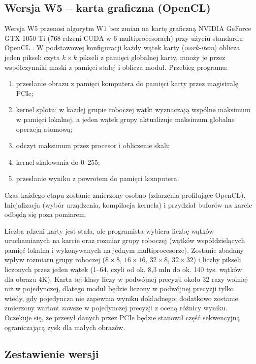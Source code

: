 \documentclass[12pt,a4paper]{article}
\begin{document}
\subsection{Wersja W5 -- karta graficzna (OpenCL)}

Wersja W5 przenosi algorytm W1 bez zmian na kartę graficzną NVIDIA GeForce GTX 1050 Ti (768 rdzeni CUDA w 6 multiprocesorach) przy użyciu standardu OpenCL \cite{opencl}. W podstawowej konfiguracji każdy wątek karty (\emph{work-item}) oblicza jeden piksel: czyta $k \times k$ pikseli z pamięci globalnej karty, mnoży je przez współczynniki maski z pamięci stałej i oblicza moduł. Przebieg programu:
\begin{enumerate}
	\item przesłanie obrazu z pamięci komputera do pamięci karty przez magistralę PCIe;
	\item kernel splotu; w każdej grupie roboczej wątki wyznaczają wspólne maksimum w pamięci lokalnej, a jeden wątek grupy aktualizuje maksimum globalne operacją atomową;
	\item odczyt maksimum przez procesor i obliczenie skali;
	\item kernel skalowania do 0--255;
	\item przesłanie wyniku z powrotem do pamięci komputera.
\end{enumerate}
Czas każdego etapu zostanie zmierzony osobno (zdarzenia profilujące OpenCL). Inicjalizacja (wybór urządzenia, kompilacja kernela) i przydział buforów na karcie odbędą się poza pomiarem.

Liczba rdzeni karty jest stała, ale programista wybiera liczbę wątków uruchamianych na karcie oraz rozmiar grupy roboczej (wątków współdzielących pamięć lokalną i wykonywanych na jednym multiprocesorze). Zostanie zbadany wpływ rozmiaru grupy roboczej ($8\times8$, $16\times16$, $32\times8$, $32\times32$) i liczby pikseli liczonych przez jeden wątek (1--64, czyli od ok. 8,3 mln do ok. 140 tys. wątków dla obrazu 4K). Karta tej klasy liczy w podwójnej precyzji około 32 razy wolniej niż w pojedynczej, dlatego moduł będzie liczony w podwójnej precyzji tylko wtedy, gdy pojedyncza nie zapewnia wyniku dokładnego; dodatkowo zostanie zmierzony wariant zawsze w pojedynczej precyzji z oceną różnicy wyniku. Oczekuje się, że przesył danych przez PCIe będzie stanowił część sekwencyjną ograniczającą zysk dla małych obrazów.

\subsection{Zestawienie wersji}
\end{document}
